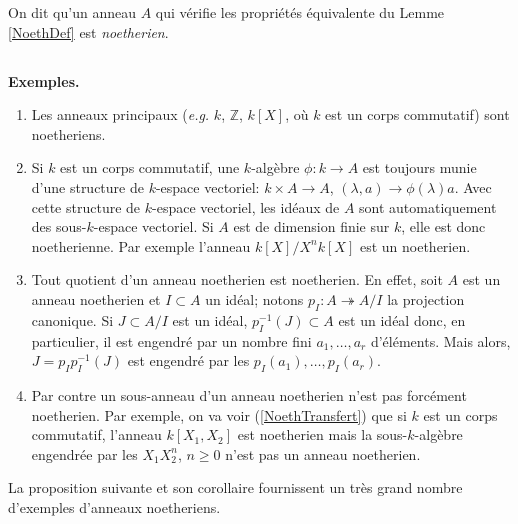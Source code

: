 \documentclass[a4paper, 12pt]{amsart}
\newcommand{\Z}{\mathbb{Z}}
\begin{document}
    \noindent On dit qu'un anneau $A$ qui v\'erifie les propri\'et\'es \'equivalente du Lemme \ref{NoethDef} est \textit{noetherien}.
    
    \subsection{}\label{NoethEx}\textbf{Exemples.} 
      \begin{enumerate}[leftmargin=* ,parsep=0cm,itemsep=0cm,topsep=0cm]
     \item  Les anneaux principaux (\textit{e.g.} $k$, $\Z$, $k[X]$, o\`u $k$ est un corps commutatif) sont noetheriens. 
     \item  Si $k$ est un corps commutatif, une  $k$-alg\`ebre $\phi:k\rightarrow A$ est toujours munie d'une structure de $k$-espace vectoriel: $k\times A\rightarrow A$, $(\lambda,a)\rightarrow \phi(\lambda)a$. Avec cette structure de $k$-espace vectoriel, les id\'eaux de $A$ sont automatiquement des sous-$k$-espace vectoriel. Si $A$ est de dimension finie sur $k$, elle est donc noetherienne. Par exemple l'anneau $k[X]/X^nk[X]$ est un  noetherien. 
     \item  Tout quotient d'un anneau noetherien est noetherien. En effet, soit $A$ est un anneau noetherien et $I\subset A$  un id\'eal; notons $p_I:A\twoheadrightarrow A/I$ la projection canonique. Si $J\subset A/I$ est un id\'eal, $p_I^{-1}(J)\subset A$ est un id\'eal donc, en particulier, il est engendr\'e par un nombre fini $a_1,\dots, a_r$ d'\'el\'ements. Mais alors, $J=p_Ip_I^{-1}(J)$ est engendr\'e par les  $p_I(a_1),\dots, p_I(a_r)$.
     \item Par contre un sous-anneau d'un anneau noetherien n'est pas forc\'ement noetherien. Par exemple, on va voir (\ref{NoethTransfert}) que si $k$ est un corps commutatif, l'anneau $k[X_1,X_2]$ est noetherien mais la sous-$k$-alg\`ebre engendr\'ee par les $  X_1X_2^n$, $n\geq 0$ n'est pas un anneau noetherien.\\
\end{enumerate}
    
\noindent La proposition suivante et son corollaire fournissent un tr\`es grand nombre d'exemples d'anneaux noetheriens.   
    
\end{document}
